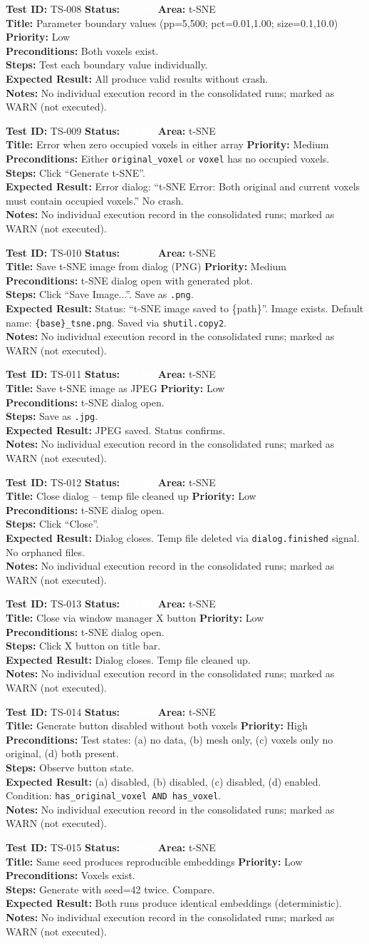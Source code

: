 \documentclass[12pt,a4paper]{article}
\newcommand{\statuspass}{\colorbox{statusgreen}{\textcolor{white}{\textbf{\,PASS\,}}}}
\newcommand{\testcase}[9]{%
  \smallskip
  \noindent\textbf{Test ID:} #1 \hfill \textbf{Status:} #2 \hfill \textbf{Area:} #3 \\
  \textbf{Title:} #4 \hfill \textbf{Priority:} #5 \\[0.3em]
  \textbf{Preconditions:} #6 \\[0.3em]
  \textbf{Steps:} #7 \\[0.3em]
  \textbf{Expected Result:} #8 \\
  \textbf{Notes:} #9
  \smallskip
}
\begin{document}
\testcase{TS-008}{\statuspass}{t-SNE}{Parameter boundary values (pp=5,500; pct=0.01,1.00; size=0.1,10.0)}{Low}{Both voxels exist.}{Test each boundary value individually.}{All produce valid results without crash.}{No individual execution record in the consolidated runs; marked as WARN (not executed).}


\testcase{TS-009}{\statuspass}{t-SNE}{Error when zero occupied voxels in either array}{Medium}{Either \texttt{original\_voxel} or \texttt{voxel} has no occupied voxels.}{Click ``Generate t-SNE''.}{Error dialog: ``t-SNE Error: Both original and current voxels must contain occupied voxels.'' No crash.}{No individual execution record in the consolidated runs; marked as WARN (not executed).}


\testcase{TS-010}{\statuspass}{t-SNE}{Save t-SNE image from dialog (PNG)}{Medium}{t-SNE dialog open with generated plot.}{Click ``Save Image...''. Save as \texttt{.png}.}{Status: ``t-SNE image saved to \{path\}''. Image exists. Default name: \texttt{\{base\}\_tsne.png}. Saved via \texttt{shutil.copy2}.}{No individual execution record in the consolidated runs; marked as WARN (not executed).}


\testcase{TS-011}{\statuspass}{t-SNE}{Save t-SNE image as JPEG}{Low}{t-SNE dialog open.}{Save as \texttt{.jpg}.}{JPEG saved. Status confirms.}{No individual execution record in the consolidated runs; marked as WARN (not executed).}


\testcase{TS-012}{\statuspass}{t-SNE}{Close dialog -- temp file cleaned up}{Low}{t-SNE dialog open.}{Click ``Close''.}{Dialog closes. Temp file deleted via \texttt{dialog.finished} signal. No orphaned files.}{No individual execution record in the consolidated runs; marked as WARN (not executed).}


\testcase{TS-013}{\statuspass}{t-SNE}{Close via window manager X button}{Low}{t-SNE dialog open.}{Click X button on title bar.}{Dialog closes. Temp file cleaned up.}{No individual execution record in the consolidated runs; marked as WARN (not executed).}


\testcase{TS-014}{\statuspass}{t-SNE}{Generate button disabled without both voxels}{High}{Test states: (a) no data, (b) mesh only, (c) voxels only no original, (d) both present.}{Observe button state.}{(a) disabled, (b) disabled, (c) disabled, (d) enabled. Condition: \texttt{has\_original\_voxel AND has\_voxel}.}{No individual execution record in the consolidated runs; marked as WARN (not executed).}


\testcase{TS-015}{\statuspass}{t-SNE}{Same seed produces reproducible embeddings}{Low}{Voxels exist.}{Generate with seed=42 twice. Compare.}{Both runs produce identical embeddings (deterministic).}{No individual execution record in the consolidated runs; marked as WARN (not executed).}
\end{document}
